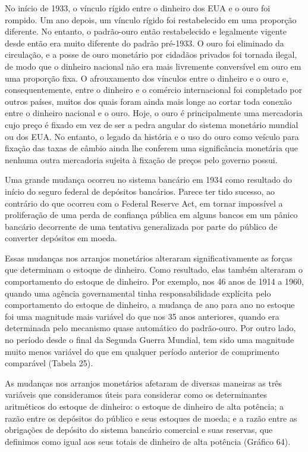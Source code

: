 \documentclass[12pt]{article}
\begin{document}
No início de 1933, o vínculo rígido entre o dinheiro dos EUA e o ouro foi rompido. Um ano depois, um vínculo rígido foi restabelecido em uma proporção diferente. No entanto, o padrão-ouro então restabelecido e legalmente vigente desde então era muito diferente do padrão pré-1933. O ouro foi eliminado da circulação, e a posse de ouro monetário por cidadãos privados foi tornada ilegal, de modo que o dinheiro nacional não era mais livremente conversível em ouro em uma proporção fixa. O afrouxamento dos vínculos entre o dinheiro e o ouro e, consequentemente, entre o dinheiro e o comércio internacional foi completado por outros países, muitos dos quais foram ainda mais longe ao cortar toda conexão entre o dinheiro nacional e o ouro. Hoje, o ouro é principalmente uma mercadoria cujo preço é fixado em vez de ser a pedra angular do sistema monetário mundial ou dos EUA. No entanto, o legado da história e o uso do ouro como veículo para fixação das taxas de câmbio ainda lhe conferem uma significância monetária que nenhuma outra mercadoria sujeita à fixação de preços pelo governo possui.

Uma grande mudança ocorreu no sistema bancário em 1934 como resultado do início do seguro federal de depósitos bancários. Parece ter tido sucesso, ao contrário do que ocorreu com o Federal Reserve Act, em tornar impossível a proliferação de uma perda de confiança pública em alguns bancos em um pânico bancário decorrente de uma tentativa generalizada por parte do público de converter depósitos em moeda.

Essas mudanças nos arranjos monetários alteraram significativamente as forças que determinam o estoque de dinheiro. Como resultado, elas também alteraram o comportamento do estoque de dinheiro. Por exemplo, nos 46 anos de 1914 a 1960, quando uma agência governamental tinha responsabilidade explícita pelo comportamento do estoque de dinheiro, a mudança de ano para ano no estoque foi uma magnitude mais variável do que nos 35 anos anteriores, quando era determinada pelo mecanismo quase automático do padrão-ouro. Por outro lado, no período desde o final da Segunda Guerra Mundial, tem sido uma magnitude muito menos variável do que em qualquer período anterior de comprimento comparável (Tabela 25).

As mudanças nos arranjos monetários afetaram de diversas maneiras as três variáveis que consideramos úteis para considerar como os determinantes aritméticos do estoque de dinheiro: o estoque de dinheiro de alta potência; a razão entre os depósitos do público e seus estoques de moeda; e a razão entre as obrigações de depósito do sistema bancário comercial e suas reservas, que definimos como igual aos seus totais de dinheiro de alta potência (Gráfico 64).
\end{document}

